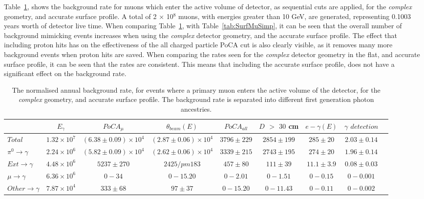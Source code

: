Table~\ref{tab:SurfMuComp}, shows the background rate for muons which enter the active volume of detector, as sequential cuts are applied, for the \emph{complex} geometry, and accurate surface profile. A total of 2 $\times$ 10$^8$ muons, with energies greater than 10 GeV, are generated, representing 0.1003 years worth of detector live time. When comparing Table~\ref{tab:SurfMuComp}, with Table~\ref{tab:SurfMuSimp}, it can be seen that the overall number of background mimicking events increases when using the \emph{complex} detector geometry, and the accurate surface profile. The effect that including proton hits has on the effectiveness of the all charged particle PoCA cut is also clearly visible, as it removes many more background events when proton hits are saved. When comparing the rates seen for the \emph{complex} detector geometry in the flat, and accurate surface profile, it can be seen that the rates are consistent. This means that including the accurate surface profile, does not have a significant effect on the background rate. \\

\begin{table}[h!]
  \caption[The normalised annual background rate, for events where a primary muon enters the active volume of the detector, for the \emph{complex} geometry, and accurate surface profile]
          {The normalised annual background rate, for events where a primary muon enters the active volume of the detector, for the \emph{complex} geometry, and accurate surface profile. The background rate is separated into different first generation photon ancestries.}
  \label{tab:SurfMuComp}
  \centering
  \scriptsize
  \begin{tabular}{l c c c c c c c c }
    \toprule
        & $E_\gamma$ & $PoCA_\mu$ & $\theta_{beam}(E)$ & $PoCA_{all}$ & $D$ $>$ $30$ cm & $e-\gamma(E)$ & $\gamma$ $detection$ \\
        \midrule
        $Total$          & $1.32\times10^7$ & $(6.38\pm0.09)\times10^4$ & $(2.87\pm0.06)\times10^4$ & $3796\pm229$ & $2854\pm199$ & $285\pm20$   & $2.03\pm0.14$ \\

        $\pi^0\to\gamma$ & $2.24\times10^6$ & $(5.82\pm0.09)\times10^4$ & $(2.62\pm0.06)\times10^4$ & $3339\pm215$ & $2743\pm195$ & $274\pm20$   & $1.96\pm0.14$ \\

        $Ext\to\gamma$   & $4.48\times10^6$ & $5237\pm270$              & $2425/pm183$              & $457\pm80$   & $111\pm39$   & $11.1\pm3.9$ & $0.08\pm0.03$ \\

        $\mu\to\gamma$   & $6.36\times10^6$ & $0-34$                    & $0-15.20$                 & $0-2.01$     & $0-1.51$     & $0-0.15$     & $0-0.001$ \\

        $Other\to\gamma$ & $7.87\times10^4$ & $333\pm68$                & $97\pm37$                 & $0-15.20$    & $0-11.43$    & $0-0.11$     & $0-0.002$ \\
        \bottomrule
  \end{tabular}
\end{table}

